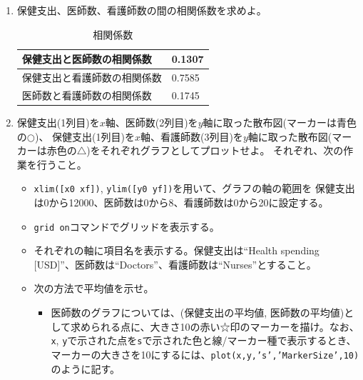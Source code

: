 \documentclass[dvipdfmx]{jsarticle}
\begin{document}
\begin{enumerate}[(1)]
\begin{verbatim}
>> m = mean(d)

m =

   1.0e+03 *

    3.9941    0.0035    0.0088

>> mean(d(:,1))

ans =

   3.9941e+03

>> mean(d(:,2))

ans =

    3.4889

>> mean(d(:,3))

ans =

    8.8444

\end{verbatim}

\item 保健支出、医師数、看護師数の間の相関係数を求めよ。
\begin{table}[H]
\centering
\caption{相関係数}
\begin{tabular}{l|l}
\hline
保健支出と医師数の相関係数 & 0.1307               \\
\hline
保健支出と看護師数の相関係数 & 0.7585               \\
\hline
医師数と看護師数の相関係数 & 0.1745               \\
\hline
\end{tabular}
\end{table}
\item
保健支出(1列目)を$x$軸、医師数(2列目)を$y$軸に取った散布図(マーカーは青色の$\bigcirc$)、
保健支出(1列目)を$x$軸、看護師数(3列目)を$y$軸に取った散布図(マーカーは赤色の$\triangle$)をそれぞれグラフとしてプロットせよ。
それぞれ、次の作業を行うこと。
\begin{itemize}
\item \texttt{xlim([x0 xf])}, \texttt{ylim([y0 yf])}を用いて、グラフの軸の範囲を
保健支出は0から12000、医師数は0から8、看護師数は0から20に設定する。
\item \texttt{grid on}コマンドでグリッドを表示する。
\item それぞれの軸に項目名を表示する。保健支出は``Health spending [USD]''、医師数は``Doctors''、看護師数は``Nurses''とすること。
\item 次の方法で平均値を示せ。
\begin{itemize}
\item 医師数のグラフについては、(保健支出の平均値, 医師数の平均値)として求められる点に、大きさ10の赤い☆印のマーカーを描け。なお、\texttt{x}, \texttt{y}で示された点を\texttt{s}で示された色と線/マーカー種で表示するとき、マーカーの大きさを10にするには、\texttt{plot(x,y,'s','MarkerSize',10)}のように記す。

\end{itemize}
\end{itemize}
\end{enumerate}
\end{document}
